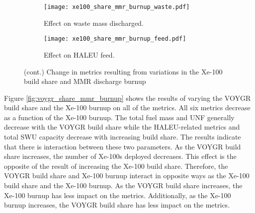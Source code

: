 \begin{figure}
    \ContinuedFloat    
    \begin{subfigure}[h!]{0.48\textwidth}
        \centering
        \texttt{[image: xe100\_share\_mmr\_burnup\_waste.pdf]}
        \caption{Effect on waste mass discharged.}
        \label{fig:xe100_share_mmr_burnup_waste}
    \end{subfigure}
    \hfill
    \begin{subfigure}[h!]{0.48\textwidth}
        \centering
        \texttt{[image: xe100\_share\_mmr\_burnup\_feed.pdf]}
        \caption{Effect on HALEU feed.}
        \label{fig:xe100_share_mmr_burnup_feed}
    \end{subfigure}
    \caption{(cont.) Change in metrics resulting from variations in the 
    Xe-100 build share and MMR discharge burnup}
    \label{fig:xe100_share_mmr_burnup}
\end{figure}

Figure \ref{fig:voygr_share_mmr_burnup} shows the results of varying the 
VOYGR build share and the Xe-100 burnup on all of the metrics. All six 
metrics decrease as a function of the Xe-100 burnup. The total fuel 
mass and \gls{UNF} generally decrease with the VOYGR build share while 
the \gls{HALEU}-related metrics and total \gls{SWU} capacity decrease 
with increasing build share. The results indicate that there is interaction 
between these two parameters. As the VOYGR build share increases, the number 
of Xe-100s deployed decreases. This effect is the opposite of the result of 
increasing the Xe-100 build share. Therefore, the VOYGR build share and 
Xe-100 burnup interact in opposite ways as the Xe-100 build share and the 
Xe-100 burnup. As the VOYGR build share increases, the Xe-100 burnup has less impact on the 
metrics. Additionally, as the Xe-100 burnup increases, the VOYGR 
build share has less impact on the metrics. 

